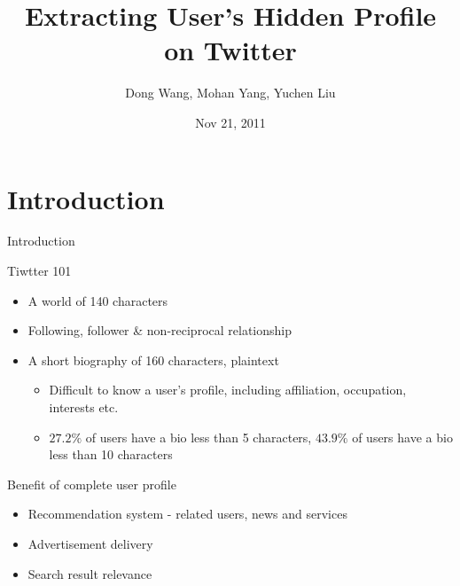 \documentclass{beamer}
\begin{document}
\title{Extracting User's Hidden Profile on Twitter}
\author{Dong Wang, Mohan Yang, Yuchen Liu}
\date{Nov 21, 2011}

\newcommand{\following}{\ensuremath{following}}
\newcommand{\follower}{\ensuremath{follower}}
\newcommand{\at}{\emph{@}}


\begin{frame}
  \titlepage
\end{frame}


\section{Introduction}
\begin{frame}{Introduction}
\begin{block}{Tiwtter 101}
\begin{itemize}
\item A world of 140 characters
\item Following, follower \& non-reciprocal relationship
\item A short biography of 160 characters, plaintext
    \begin{itemize}
    \item Difficult to know a user's profile, including affiliation, occupation, interests etc.
    \item $27.2\%$ of users have a bio less than 5 characters, $43.9\%$ of users have a bio less than 10 characters
    \end{itemize}
\end{itemize}
\end{block}
\pause
\begin{block}{Benefit of complete user profile}
\begin{itemize}
\item Recommendation system - related users, news and services
\item Advertisement delivery
\item Search result relevance
\end{itemize}
\end{block}
\end{frame}
\end{document}
